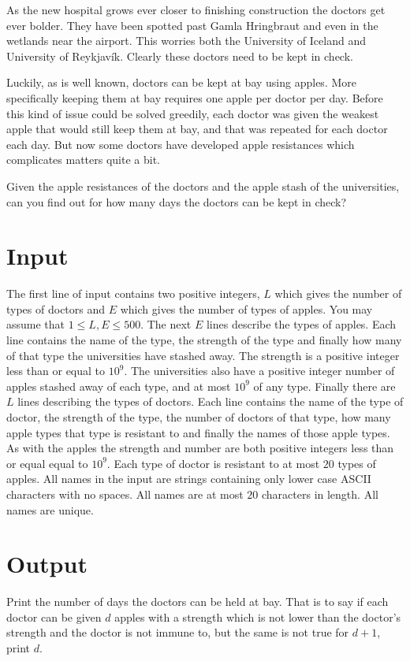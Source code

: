 
As the new hospital grows ever closer to finishing
construction the doctors get ever bolder. They have been
spotted past Gamla Hringbraut and even in the wetlands near
the airport. This worries both the University of Iceland
and University of Reykjavík. Clearly these doctors need to
be kept in check.

Luckily, as is well known, doctors can be kept at bay using
apples. More specifically keeping them at bay requires one
apple per doctor per day. Before this kind of issue could
be solved greedily, each doctor was given the weakest apple
that would still keep them at bay, and that was repeated for
each doctor each day. But now some doctors have developed
apple resistances which complicates matters quite a bit.

Given the apple resistances of the doctors and the apple
stash of the universities, can you find out for how many
days the doctors can be kept in check?

\section*{Input}
The first line of input contains two positive integers,
$L$ which gives the number of types of doctors and $E$
which gives the number of types of apples.
You may assume that $1 \leq L, E \leq 500$.
The next $E$ lines describe the types of apples.
Each line contains the name of the type, the strength
of the type and finally how many of that type the
universities have stashed away.
The strength is a positive integer less than or equal to $10^9$.
The universities also have a positive integer number of apples
stashed away of each type, and at most $10^9$ of any type.
Finally there are $L$ lines describing the types of doctors.
Each line contains the name of the type of doctor,
the strength of the type, the number of doctors of that type,
how many apple types that type is resistant to and finally
the names of those apple types.
As with the apples the strength and number are both positive
integers less than or equal equal to $10^9$.
Each type of doctor is resistant to at most $20$ types
of apples.
All names in the input are strings containing only lower
case ASCII characters with no spaces. All names are at most
$20$ characters in length. All names are unique.

\section*{Output}
Print the number of days the doctors can be held at bay.
That is to say if each doctor can be given $d$ apples
with a strength which is not lower than the doctor's strength
and the doctor is not immune to, but the same is not true for
$d + 1$, print $d$.
